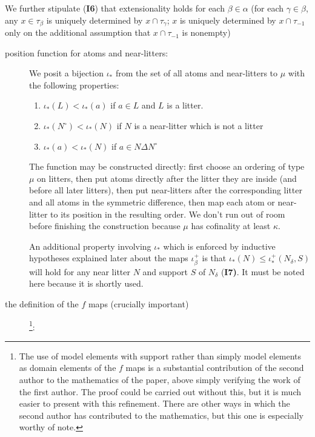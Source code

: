 \documentclass[112pt]{article}
\begin{document}
We further stipulate ({\bf I6}) that extensionality holds for each $\beta\in \alpha$ (for each $\gamma\in \beta$, any $x \in \tau_\beta$ is uniquely determined by $x \cap \tau_\gamma$;  $x$ is uniquely determined by $x \cap \tau_{-1}$ only on the additional assumption that $x \cap \tau_{-1}$ is nonempty)
\begin{description}
\item[position function for atoms and near-litters:]  We posit a bijection $\iota_*$ from the set of all atoms and near-litters to $\mu$ with the following properties:

\begin{enumerate}

\item $\iota_*(L) < \iota_*(a)$ if $a \in L$ and $L$ is a litter.

\item  $\iota_*(N^\circ)<\iota_*(N)$ if $N$ is a near-litter which is not a litter

\item $\iota_*(a) < \iota_*(N)$ if $a \in N \Delta N^\circ$

\end{enumerate}

The function may be constructed directly: first choose an ordering of type $\mu$ on litters, then put atoms directly after the litter they are inside (and before all later litters), then put near-litters after the corresponding litter and all atoms in the symmetric difference, then map each atom or near-litter to its position in the resulting order.
We don't run out of room before finishing the construction because \( \mu \) has cofinality at least \( \kappa \).

An additional property involving $\iota_*$ which is enforced by inductive hypotheses explained later about the maps $\iota_\beta^+$ is that $\iota_*(N) \leq \iota_*^+(N_\delta,S)$ will hold for any near litter $N$ and support $S$ of $N_\delta$ ({\bf I7)}.  It must be noted here because it is shortly used.


\item [the definition of the $f$ maps (crucially important)] \footnote{The use of model elements with support rather than simply model elements as domain elements of the $f$ maps is a substantial contribution of the second author to the mathematics of the paper, above simply verifying the work of the first author.  The proof could be carried out without this, but it is much easier to present with this refinement.  There are other ways in which the second author has contributed to the mathematics, but this one is especially worthy of note.}:


\end{description}
\end{document}
